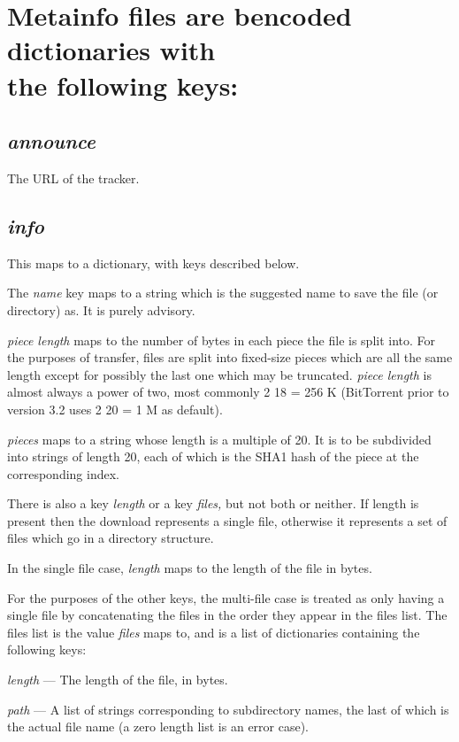 \documentclass{article}
\begin{document}
{\section {Metainfo files are bencoded dictionaries with \\ the following keys:}}
{\subsection{\it announce}}
    The URL of the tracker.

{\subsection{\it info}}
    This maps to a dictionary, with keys described below.

    The {\it name} key maps to a string which is the suggested name to save the file (or directory) as. It is purely advisory.

    {\it piece length} maps to the number of bytes in each piece the file is split into. For the purposes of transfer, files are split into fixed-size pieces which are all the same length except for possibly the last one which may be truncated. {\it piece length} is almost always a power of two, most commonly 2 18 = 256 K (BitTorrent prior to version 3.2 uses 2 20 = 1 M as default).

    {\it pieces} maps to a string whose length is a multiple of 20. It is to be subdivided into strings of length 20, each of which is the SHA1 hash of the piece at the corresponding index.

    There is also a key {\it length} or a key {\it files,} but not both or neither. If length is present then the download represents a single file, otherwise it represents a set of files which go in a directory structure.

    In the single file case, {\it length} maps to the length of the file in bytes.

    For the purposes of the other keys, the multi-file case is treated as only having a single file by concatenating the files in the order they appear in the files list. The files list is the value {\it files} maps to, and is a list of dictionaries containing the following keys:

    {\it length} --- The length of the file, in bytes.

    {\it path} --- A list of strings corresponding to subdirectory names, the last of which is the actual file name (a zero length list is an error case).
\end{document}
